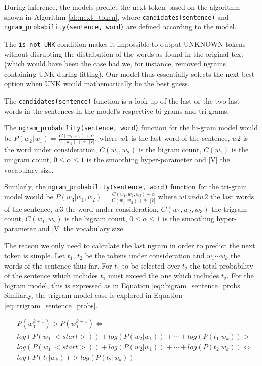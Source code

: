 \documentclass[11pt, a4paper]{article}
\begin{document}
	During inference, the models predict the next token based on the algorithm shown in Algorithm \ref{al::next_token}, where \texttt{candidates(sentence)} and \texttt{ngram\_probability(sentence, word)} are defined according to the model. 
	
	The \texttt{is not UNK} condition makes it impossible to output UNKNOWN tokens without disrupting the distribution of the words as found in the original text (which would have been the case had we, for instance, removed ngrams containing UNK during fitting). Our model thus essentially selects the next best option when UNK would mathematically be the best guess.
	
	The \texttt{candidates(sentence)} function is a look-up of the last or the two last words in the sentences in the model's respective bi-grams and tri-grams.
	
	The \texttt{ngram\_probability(sentence, word)} function for the bi-gram model would be $ P(w_2|w_1) = \frac{C(w_1,w_2) + \alpha}{C(w_1) + \alpha \cdot|V|} $, where  $w1$ is the last word of the sentence, $w2$ is the word under consideration, $ C(w_1,w_2) $ is the bigram count, $ C(w_1) $ is the unigram count, $ 0 \leq\alpha \leq1 $ is the smoothing hyper-parameter and |V| the vocabulary size.
	
	Similarly, the \texttt{ngram\_probability(sentence, word)} function for the tri-gram model would be $ P(w_3|w_1,w_2) = \frac{C(w_1,w_2,w_3) + \alpha}{C(w_1,w_2) + \alpha \cdot |V|} $ where  $w1 and w2$ the last words of the sentence, $w3$ the word under consideration, $ C(w_1,w_2,w_3) $ the trigram count, $ C(w_1,w_2) $ is the bigram count, $ 0 \leq\alpha \leq1 $ is the smoothing hyper-parameter and |V| the vocabulary size.
	
	The reason we only need to calculate the last ngram in order to predict the next token is simple. Let $t_1$, $t_2$ be the tokens under consideration and $w_1 \cdots w_k$ the words of the sentence thus far. For $t_1$ to be selected over $t_2$ the total probability of the sentence which includes $t_1$ must exceed the one which includes $t_2$. For the bigram model, this is expressed as in Equation \ref{eq::bigram_sentence_probs}. Similarly, the trigram model case is explored in Equation \ref{eq::trigram_sentence_probs}. 
	
	\begin{equation}
		\label{eq::bigram_sentence_probs}
		\begin{aligned}
			& P(w^{k+1}_1) > P(w^{k+1}_1) \iff \\
			& log(P(w_1|<start>)) + log(P(w_2|w_1)) + \cdots + log(P(t_1|w_k)) > \\
			& log(P(w_1|<start>)) + log(P(w_2|w_1)) + \cdots + log(P(t_2|w_k)) \iff \\
			& log(P(t_1|w_k)) > log(P(t_2|w_k))
		\end{aligned}
	\end{equation}
	
\end{document}
